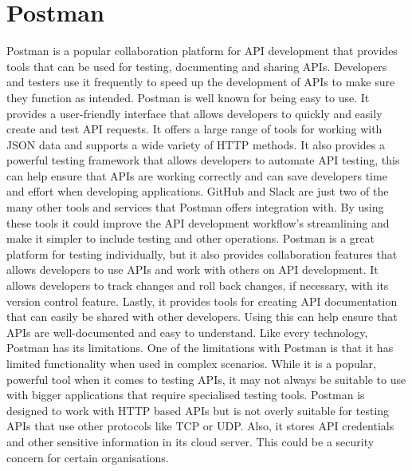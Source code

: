 \section{Postman}
Postman is a popular collaboration platform for API development that provides tools that can be used for testing, documenting and sharing APIs.\cite{PostmanPlatform} Developers and testers use it frequently to speed up the development of APIs to make sure they function as intended.
\newline \newline
Postman is well known for being easy to use. It provides a user-friendly interface that allows developers to quickly and easily create and test API requests. It offers a large range of tools for working with JSON data and supports a wide variety of HTTP methods. It also provides a powerful testing framework that allows developers to automate API testing, this can help ensure that APIs are working correctly and can save developers time and effort when developing applications. GitHub and Slack are just two of the many other tools and services that Postman offers integration with. By using these tools it could improve the API development workflow’s streamlining and make it simpler to include testing and other operations. \cite{IntroPostman}
\newline \newline
Postman is a great platform for testing individually, but it also provides collaboration features that allows developers to use APIs and work with others on API development. It allows developers to track changes and roll back changes, if necessary, with its version control feature. Lastly, it provides tools for creating API documentation that can easily be shared with other developers. Using this can help ensure that APIs are well-documented and easy to understand.
\newline \newline
Like every technology, Postman has its limitations. One of the limitations with Postman is that it has limited functionality when used in complex scenarios. While it is a popular, powerful tool when it comes to testing APIs, it may not always be suitable to use with bigger applications that require specialised testing tools. Postman is designed to work with HTTP based APIs but is not overly suitable for testing APIs that use other protocols like TCP or UDP. Also, it stores API credentials and other sensitive information in its cloud server. This could be a security concern for certain organisations.
